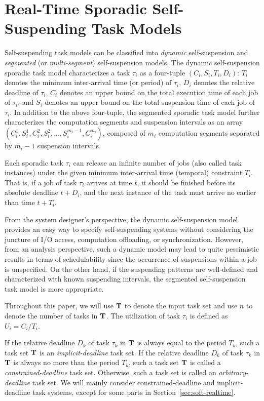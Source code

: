 \section{Real-Time Sporadic Self-Suspending Task Models}
\label{sec:model}
  
Self-suspending task models can be classified into \emph{dynamic} self-suspension and \emph{segmented} (or \emph{multi-segment}) self-suspension models. 
The dynamic self-suspension sporadic task model characterizes a
task $\tau_i$ as a four-tuple $(C_i,S_i,T_i,D_i)$: $T_i$ denotes the minimum inter-arrival time (or period) of $\tau_i$, $D_i$ denotes the relative deadline of $\tau_i$,
$C_i$ denotes an upper bound on the total execution time of each job of $\tau_i$,
and $S_i$ denotes an upper bound on the total suspension time of each job of $\tau_i$.  In addition to the above four-tuple, the segmented sporadic task model further 
characterizes the computation segments and suspension intervals as an array
$(C_{i}^1,S_{i}^1,C_{i}^2,S_{i}^2,...,S_{i}^{m_i-1},C_{i}^{m_i})$, composed of $m_i$ computation segments separated by $m_i-1$ suspension intervals. 

Each sporadic task $\tau_i$ can release an infinite number of jobs
(also called task instances) under the given minimum inter-arrival
time (temporal) constraint $T_i$.  That is, if a
job of task $\tau_i$ arrives at time $t$, it should be finished before
its absolute deadline $t+D_i$, and  the next instance of
the task must arrive no earlier than time $t + T_i$.

From the system designer's perspective, the dynamic self-suspension model provides an easy way to specify self-suspending systems without considering the juncture of I/O access, computation offloading, or synchronization. 
However, from an analysis perspective, such a  dynamic model may lead to quite pessimistic results in terms of schedulability since the occurrence of suspensions within a job is unspecified. On the other hand, if the suspending patterns are well-defined and characterized with known suspending intervals, the segmented self-suspension task model is more appropriate.   


Throughout this paper, we will use ${\bf T}$ to denote the input task
set and use $n$ to denote the number of tasks in ${\bf T}$. The
utilization of task $\tau_i$ is defined as $U_i=C_i/T_i$.

If the relative deadline $D_k$ of task $\tau_k$ in ${\bf T}$ is always
equal to the period $T_k$, such a task set ${\bf T}$ is an
\emph{implicit-deadline} task set. If the relative deadline $D_k$ of
task $\tau_k$ in ${\bf T}$ is always no more than the period $T_k$,
such a task set ${\bf T}$ is called a \emph{constrained-deadline} task
set. Otherwise, such a task set is called an \emph{arbitrary-deadline}
task set. We will mainly consider constrained-deadline and
implicit-deadline task systems, except for some parts in
Section~\ref{sec:soft-realtime}.

